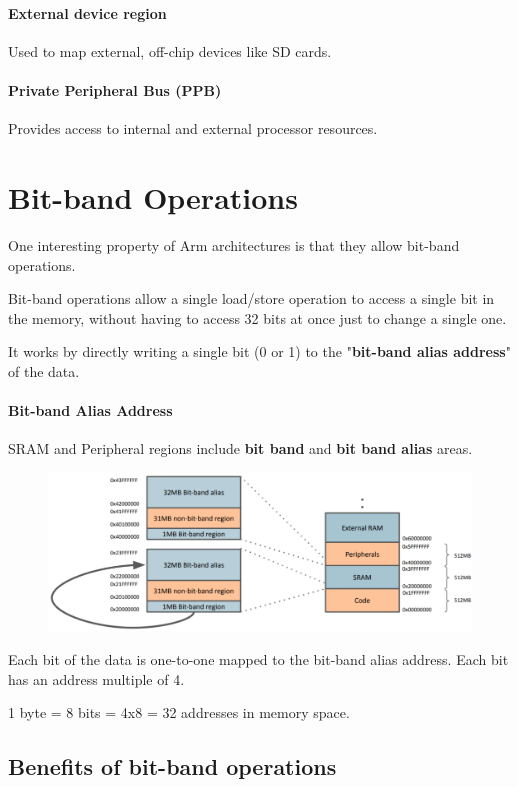 \paragraph{External device region} Used to map external, off-chip devices like SD cards.
\paragraph{Private Peripheral Bus (PPB)} Provides access to internal and external processor resources.


\section{Bit-band Operations}
One interesting property of Arm architectures is that they allow bit-band operations.

Bit-band operations allow a single load/store operation to access a single bit in the memory, without
having to access 32 bits at once just to change a single one.

It works by directly writing a single bit (0 or 1) to the "\textbf{bit-band alias address}" of the data.


\paragraph{Bit-band Alias Address}

SRAM and Peripheral regions include \textbf{bit band} and \textbf{bit band alias} areas.

\begin{figure}[H]
    \centering
    \includegraphics[width=1\linewidth]{img/image22.png}
\end{figure}

Each bit of the data is one-to-one mapped to the bit-band alias address. Each bit has an address multiple
of 4.


1 byte = 8 bits = 4x8 = 32 addresses in memory space.


\subsection{Benefits of bit-band operations}

